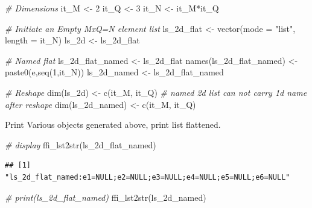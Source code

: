 \documentclass[
]{book}
\newenvironment{Shaded}{\begin{snugshade}}{\end{snugshade}}
\newcommand{\AttributeTok}[1]{\textcolor[rgb]{0.77,0.63,0.00}{#1}}
\newcommand{\CommentTok}[1]{\textcolor[rgb]{0.56,0.35,0.01}{\textit{#1}}}
\newcommand{\DecValTok}[1]{\textcolor[rgb]{0.00,0.00,0.81}{#1}}
\newcommand{\FunctionTok}[1]{\textcolor[rgb]{0.00,0.00,0.00}{#1}}
\newcommand{\NormalTok}[1]{#1}
\newcommand{\OtherTok}[1]{\textcolor[rgb]{0.56,0.35,0.01}{#1}}
\newcommand{\SpecialCharTok}[1]{\textcolor[rgb]{0.00,0.00,0.00}{#1}}
\newcommand{\StringTok}[1]{\textcolor[rgb]{0.31,0.60,0.02}{#1}}
\begin{document}
\begin{Shaded}
\begin{Highlighting}[]
\CommentTok{\# Dimensions}
\NormalTok{it\_M }\OtherTok{\textless{}{-}} \DecValTok{2}
\NormalTok{it\_Q }\OtherTok{\textless{}{-}} \DecValTok{3}
\NormalTok{it\_N }\OtherTok{\textless{}{-}}\NormalTok{ it\_M}\SpecialCharTok{*}\NormalTok{it\_Q}

\CommentTok{\# Initiate an Empty MxQ=N element list}
\NormalTok{ls\_2d\_flat }\OtherTok{\textless{}{-}} \FunctionTok{vector}\NormalTok{(}\AttributeTok{mode =} \StringTok{"list"}\NormalTok{, }\AttributeTok{length =}\NormalTok{ it\_N)}
\NormalTok{ls\_2d }\OtherTok{\textless{}{-}}\NormalTok{ ls\_2d\_flat}

\CommentTok{\# Named flat}
\NormalTok{ls\_2d\_flat\_named }\OtherTok{\textless{}{-}}\NormalTok{ ls\_2d\_flat}
\FunctionTok{names}\NormalTok{(ls\_2d\_flat\_named) }\OtherTok{\textless{}{-}} \FunctionTok{paste0}\NormalTok{(}\StringTok{\textquotesingle{}e\textquotesingle{}}\NormalTok{,}\FunctionTok{seq}\NormalTok{(}\DecValTok{1}\NormalTok{,it\_N))}
\NormalTok{ls\_2d\_named }\OtherTok{\textless{}{-}}\NormalTok{ ls\_2d\_flat\_named}

\CommentTok{\# Reshape}
\FunctionTok{dim}\NormalTok{(ls\_2d) }\OtherTok{\textless{}{-}} \FunctionTok{c}\NormalTok{(it\_M, it\_Q)}
\CommentTok{\# named 2d list can not carry 1d name after reshape}
\FunctionTok{dim}\NormalTok{(ls\_2d\_named) }\OtherTok{\textless{}{-}} \FunctionTok{c}\NormalTok{(it\_M, it\_Q)}
\end{Highlighting}
\end{Shaded}

Print Various objects generated above, print list flattened.

\begin{Shaded}
\begin{Highlighting}[]
\CommentTok{\# display}
\FunctionTok{ffi\_lst2str}\NormalTok{(ls\_2d\_flat\_named)}
\end{Highlighting}
\end{Shaded}

\begin{verbatim}
## [1] "ls_2d_flat_named:e1=NULL;e2=NULL;e3=NULL;e4=NULL;e5=NULL;e6=NULL"
\end{verbatim}

\begin{Shaded}
\begin{Highlighting}[]
\CommentTok{\# print(ls\_2d\_flat\_named)}
\FunctionTok{ffi\_lst2str}\NormalTok{(ls\_2d\_named)}
\end{Highlighting}
\end{Shaded}
\end{document}
